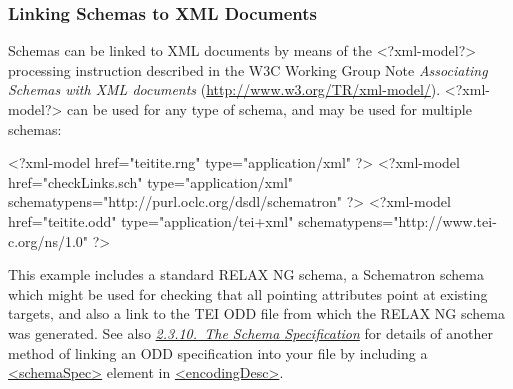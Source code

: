 \subsubsection[{Linking Schemas to XML Documents}]{Linking Schemas to XML Documents}\label{TD-LinkingSchemas}\par
Schemas can be linked to XML documents by means of the <?xml-model?> processing instruction described in the W3C Working Group Note \textit{Associating Schemas with XML documents} (\url{http://www.w3.org/TR/xml-model/}). <?xml-model?> can be used for any type of schema, and may be used for multiple schemas: \par\hfill\bgroup\exampleFont\vskip 10pt\begin{shaded}
\obeyspaces <?xml-model href="tei\textunderscore tite.rng" type="application/xml" ?>\newline
<?xml-model href="checkLinks.sch" type="application/xml" schematypens="http://purl.oclc.org/dsdl/schematron" ?>\newline
<?xml-model href="tei\textunderscore tite.odd" type="application/tei+xml" schematypens="http://www.tei-c.org/ns/1.0" ?>\end{shaded}
\par\egroup 
 This example includes a standard RELAX NG schema, a Schematron schema which might be used for checking that all pointing attributes point at existing targets, and also a link to the TEI ODD file from which the RELAX NG schema was generated. See also \textit{\hyperref[HDSCHSPEC]{2.3.10.\ The Schema Specification}} for details of another method of linking an ODD specification into your file by including a \hyperref[TEI.schemaSpec]{<schemaSpec>} element in \hyperref[TEI.encodingDesc]{<encodingDesc>}.

